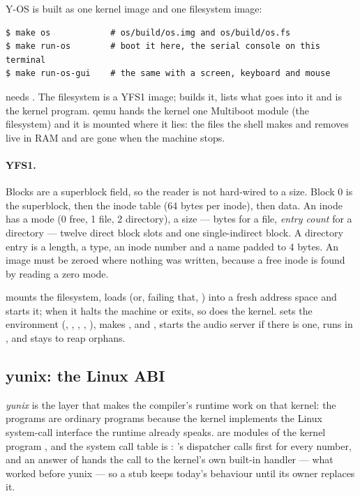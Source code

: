 Y-OS is built as one kernel image and one filesystem image:

\begin{lstlisting}
$ make os            # os/build/os.img and os/build/os.fs
$ make run-os        # boot it here, the serial console on this terminal
$ make run-os-gui    # the same with a screen, keyboard and mouse
\end{lstlisting}

\noindent {} needs . The filesystem is a
YFS1 image;  builds it,  lists what
goes into it and  is the kernel program. qemu hands the
kernel one Multiboot module (the filesystem) and it is mounted where it lies:
the files the shell makes and removes live in RAM and are gone when the
machine stops.

\paragraph{YFS1.} Blocks are a superblock field, so the reader is not
hard-wired to a size. Block 0 is the superblock, then the inode table
(64 bytes per inode), then data. An inode has a mode (0 free, 1 file, 2
directory), a size --- bytes for a file, \emph{entry count} for a directory
--- twelve direct block slots and one single-indirect block. A directory entry
is a length, a type, an inode number and a name padded to 4 bytes. An image
must be zeroed where nothing was written, because a free inode is found by
reading a zero mode.

 mounts the filesystem, loads  (or, failing that,
) into a fresh address space and starts it; when it halts the machine
or exits, so does the kernel.  sets the environment
(, , , , ), makes
,  and , starts the audio server
 if there is one, runs  in , and
stays to reap orphans.

\subsection{yunix: the Linux ABI}

\emph{yunix} is the layer that makes the compiler's runtime work on that
kernel: the programs are ordinary  programs because the kernel
implements the Linux system-call interface the runtime already speaks.
 are modules of the kernel program , and the
system call table is : 's dispatcher calls
 first for every number, and an answer of
 hands the call to the kernel's own built-in handler
--- what worked before yunix --- so a stub keeps today's behaviour until its
owner replaces it.

